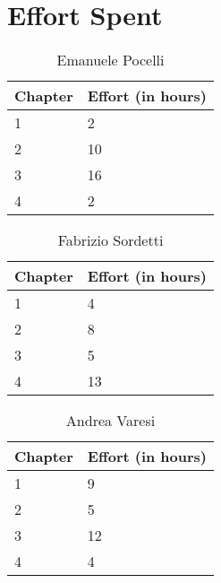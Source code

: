\section{Effort Spent}


\begin{table}[h]
  \centering
  \caption*{Emanuele Pocelli}
  \begin{tabularx}{\textwidth}{|X|X|}
    \hline
    \textbf{Chapter} & \textbf{Effort (in hours)}\\
    \hline
    1 & 2\\
    \hline
    2 & 10\\ 
    \hline
    3 & 16\\
    \hline 
    4 & 2\\ 
    \hline
  \end{tabularx}
\end{table}

\begin{table}[h]
  \centering
  \caption*{Fabrizio Sordetti}
  \begin{tabularx}{\textwidth}{|X|X|}
    \hline
    \textbf{Chapter} & \textbf{Effort (in hours)}\\
    \hline
    1 & 4\\
    \hline
    2 & 8\\
    \hline
    3 & 5\\
    \hline 
    4 & 13\\
    \hline
  \end{tabularx}
\end{table}

\begin{table}[h]
  \centering
  \caption*{Andrea Varesi}
  \begin{tabularx}{\textwidth}{|X|X|}
    \hline
    \textbf{Chapter} & \textbf{Effort (in hours)}\\
    \hline
    1 & 9\\
    \hline
    2 & 5\\
    \hline
    3 & 12\\
    \hline 
    4 & 4\\
    \hline
  \end{tabularx}
\end{table}